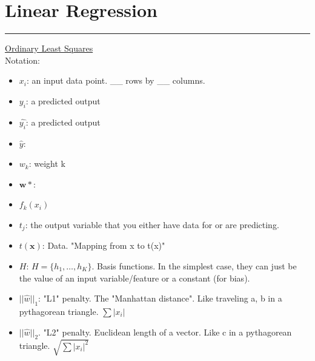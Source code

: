 \section{Linear Regression}
\smallskip \hrule height 2pt \smallskip

\underline{Ordinary Least Squares} \hfill \\

Notation:
\begin{itemize}
	\item \textbf{$x_i$}: an input data point.  \_\_ rows by \_\_ columns. 
	\item \textbf{$y_i$}: a predicted output
	\item \textbf{$\widehat{y_i}$}: a predicted output
	\item \textbf{$\widehat{y}$}: 
	\item \textbf{$w_k$}: weight k
	\item \textbf{$\bm{w}*$}:
	\item \textbf{$f_k(x_i)$}
	\item \textbf{$t_j$}: the output variable that you either have data for or are predicting. 
	\item \textbf{$t(\bm{x})$}: Data.  "Mapping from x to t(x)"
	\item \textbf{$H$}: $H = \{ h_1, \dots, h_K \}$.  Basis functions.  In the simplest case, they can just be the value of an input variable/feature or a constant (for bias).  
	\item \textbf{$ || \widehat{w} ||_1$}: "L1" penalty.  The "Manhattan distance".  Like traveling a, b in a pythagorean triangle.  $\sum |x_i|$
	\item \textbf{$ || \widehat{w} ||_2$}.  "L2" penalty.  Euclidean length of a vector.  Like c in a pythagorean triangle.  $\sqrt{\sum |x_i|^2}$	
\end{itemize}

